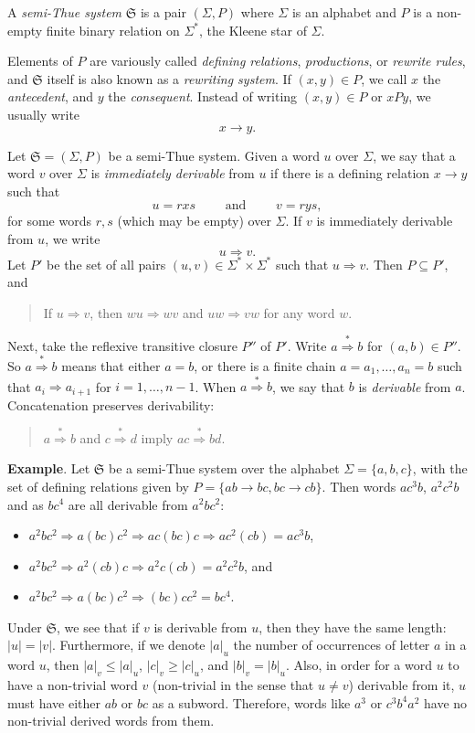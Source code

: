 \documentclass[12pt]{article}
\newcommand{\derive}{\stackrel{*}{\Rightarrow}}
\begin{document}
A \emph{semi-Thue system} $\mathfrak{S}$ is a pair $(\Sigma, P)$ where $\Sigma$ is an alphabet and $P$ is a non-empty finite binary relation on $\Sigma^*$, the Kleene star of $\Sigma$.  

Elements of $P$ are variously called \emph{defining relations}, \emph{productions}, or \emph{rewrite rules}, and $\mathfrak{S}$ itself is also known as a \emph{rewriting system}.  If $(x,y)\in P$, we call $x$ the \emph{antecedent}, and $y$ the \emph{consequent}.  Instead of writing $(x,y)\in P$ or $xPy$, we usually write $$x\to y.$$

Let $\mathfrak{S}=(\Sigma,P)$ be a semi-Thue system.  Given a word $u$ over $\Sigma$, we say that a word $v$ over $\Sigma$ is \emph{immediately derivable} from $u$ if there is a defining relation $x\to y$ such that $$u=rxs\qquad\mbox{ and }\qquad v=rys,$$ for some words $r,s$ (which may be empty) over $\Sigma$.  If $v$ is immediately derivable from $u$, we write $$u\Rightarrow v.$$  Let $P'$ be the set of all pairs $(u,v)\in \Sigma^*\times \Sigma^*$ such that $u\Rightarrow v$.  Then $P\subseteq P'$, and 
\begin{quote}\begin{center}
If $u\Rightarrow v$, then $wu\Rightarrow wv$ and $uw\Rightarrow vw$ for any word $w$.
\end{center}\end{quote}
Next, take the reflexive transitive closure $P''$ of $P'$.  Write $a\derive b$ for $(a,b)\in P''$.  So $a\derive b$ means that either $a=b$, or there is a finite chain $a=a_1,\ldots,a_n=b$ such that $a_i\Rightarrow a_{i+1}$ for $i=1,\ldots,n-1$.  When $a\derive b$, we say that $b$ is \emph{derivable} from $a$.  Concatenation preserves derivability:
\begin{quote}\begin{center}
$a\derive b$ and $c\derive d$ imply $ac\derive bd$.
\end{center}\end{quote}

\textbf{Example}.  Let $\mathfrak{S}$ be a semi-Thue system over the alphabet $\Sigma=\lbrace a,b,c\rbrace$, with the set of defining relations given by $P=\lbrace ab\to bc, bc \to cb \rbrace$.  Then words $ac^3b$, $a^2c^2b$ and 
as $bc^4$ are all derivable from $a^2bc^2$:
\begin{itemize}
\item $a^2bc^2 \Rightarrow a(bc)c^2 \Rightarrow ac(bc)c \Rightarrow ac^2(cb) = ac^3b$,
\item $a^2bc^2 \Rightarrow a^2(cb)c \Rightarrow a^2c(cb) = a^2c^2b$, and
\item $a^2bc^2 \Rightarrow a(bc)c^2 \Rightarrow (bc)cc^2 = bc^4$.
\end{itemize}
Under $\mathfrak{S}$, we see that if $v$ is derivable from $u$, then they have the same length: $|u|=|v|$.  Furthermore, if we denote $|a|_u$ the number of occurrences of letter $a$ in a word $u$, then $|a|_v\le |a|_u$, $|c|_v\ge |c|_u$, and $|b|_v = |b|_u$.  Also, in order for a word $u$ to have a non-trivial word $v$ (non-trivial in the sense that $u\ne v$) derivable from it, $u$ must have either $ab$ or $bc$ as a subword.  Therefore, words like $a^3$ or $c^3b^4a^2$ have no non-trivial derived words from them.
\end{document}
